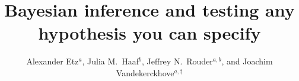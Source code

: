 \documentclass[man]{apa6}
\title{Bayesian inference and testing any hypothesis you can specify}
\author{Alexander Etz$^a$, Julia M.\ Haaf$^b$, Jeffrey N.\ Rouder$^{a,b}$, and Joachim Vandekerckhove$^{a,\dagger}$}
\affiliation{$^a$University of California, Irvine\\$^b$University of Missouri}
\renewcommand{\:}{{:}}
\begin{document}



\null
\end{document}
